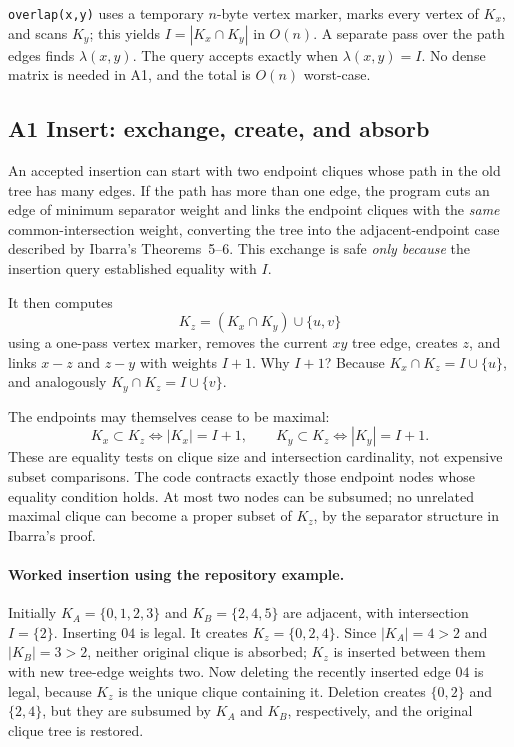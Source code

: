\texttt{overlap(x,y)} uses a temporary \(n\)-byte vertex marker, marks every vertex of \(K_x\), and scans \(K_y\); this yields \(I=|K_x\cap K_y|\) in \(O(n)\).  A separate pass over the path edges finds \(\lambda(x,y)\).  The query accepts exactly when \(\lambda(x,y)=I\).  No dense matrix is needed in A1, and the total is \(O(n)\) worst-case.

\subsection{A1 Insert: exchange, create, and absorb}
An accepted insertion can start with two endpoint cliques whose path in the old tree has many edges.  If the path has more than one edge, the program cuts an edge of minimum separator weight and links the endpoint cliques with the \emph{same} common-intersection weight, converting the tree into the adjacent-endpoint case described by Ibarra's Theorems~5--6.  This exchange is safe \emph{only because} the insertion query established equality with \(I\).

It then computes
\[
K_z=(K_x\cap K_y)\cup\{u,v\}
\]
using a one-pass vertex marker, removes the current \(xy\) tree edge, creates \(z\), and links \(x-z\) and \(z-y\) with weights \(I+1\).  Why \(I+1\)? Because \(K_x\cap K_z=I\cup\{u\}\), and analogously \(K_y\cap K_z=I\cup\{v\}\).

The endpoints may themselves cease to be maximal:
\[
K_x\subset K_z\iff |K_x|=I+1,\qquad
K_y\subset K_z\iff |K_y|=I+1.
\]
These are equality tests on clique size and intersection cardinality, not expensive subset comparisons.  The code contracts exactly those endpoint nodes whose equality condition holds.  At most two nodes can be subsumed; no unrelated maximal clique can become a proper subset of \(K_z\), by the separator structure in Ibarra's proof.

\paragraph{Worked insertion using the repository example.} Initially \(K_A=\{0,1,2,3\}\) and \(K_B=\{2,4,5\}\) are adjacent, with intersection \(I=\{2\}\).  Inserting \(04\) is legal.  It creates \(K_z=\{0,2,4\}\).  Since \(|K_A|=4>2\) and \(|K_B|=3>2\), neither original clique is absorbed; \(K_z\) is inserted between them with new tree-edge weights two.  Now deleting the recently inserted edge \(04\) is legal, because \(K_z\) is the unique clique containing it.  Deletion creates \(\{0,2\}\) and \(\{2,4\}\), but they are subsumed by \(K_A\) and \(K_B\), respectively, and the original clique tree is restored.

